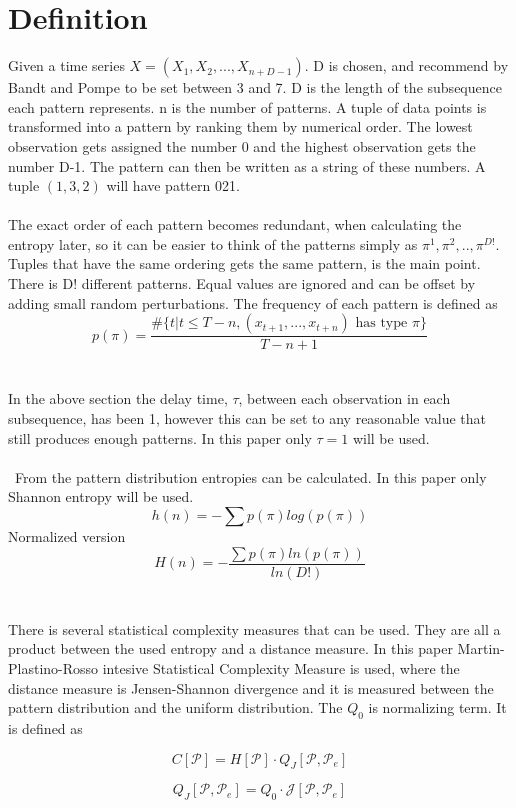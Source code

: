 \section{Definition}
Given a time series $X=(X_1,X_2,...,X_{n+D-1})$. D is chosen, and recommend by Bandt and Pompe to be set between 3 and 7. D is the length of the subsequence each pattern represents. n is the number of patterns. A tuple of data points is transformed into a pattern by ranking them by numerical order. The lowest observation gets assigned the number 0 and the highest observation gets the number D-1. The pattern can then be written as a string of these numbers. A tuple $(1,3,2)$ will have pattern 021. 
\\\\
The exact order of each pattern becomes redundant, when calculating the entropy later, so it can be easier to think of the patterns simply as $\pi^1,\pi^2,..,\pi^{D!}$. Tuples that have the same ordering gets the same pattern, is the main point. There is D! different patterns. Equal values are ignored and can be offset by adding small random perturbations. The frequency of each pattern is defined as
$$p(\pi)=\frac{\#\{t|t\leq T-n,(x_{t+1},...,x_{t+n}) \mbox{ has type }\pi\}}{T-n+1}$$
\cite{Bandt2002}
\\\\
In the above section the delay time, $\tau$, between each observation in each subsequence, has been 1, however this can be set to any reasonable value that still produces enough patterns. In this paper only $\tau=1$ will be used.
\\\\\
From the pattern distribution entropies can be calculated. In this paper only Shannon entropy will be used. 
$$h(n)=-\sum p(\pi) log(p(\pi))$$
Normalized version
$$H(n)=-\frac{\sum p(\pi) ln(p(\pi))}{ln(D!)}$$
\\\\
There is several statistical complexity measures that can be used. They are all a product between the used entropy and a distance measure. In this paper Martin-Plastino-Rosso intesive Statistical Complexity Measure is used, where the distance measure is Jensen-Shannon divergence and it is measured between the pattern distribution and the uniform distribution. The $Q_0$ is normalizing term. It is defined as

$$C[\mathscr{P}]=H[\mathscr{P}]\cdot Q_J[\mathscr{P},\mathscr{P}_e]$$

$$Q_J[\mathscr{P},\mathscr{P}_e]=Q_0\cdot \mathscr{J}[\mathscr{P},\mathscr{P}_e]$$


